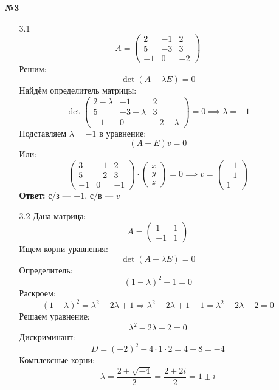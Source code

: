 \documentclass[a4paper]{article}
\begin{document}
\begin{enumerate}
   \item[\textbf{№3}]
   \begin{enumerate}
    \item[3.1]\[
    A = 
    \begin{pmatrix}
    2 & -1 & 2 \\
    5 & -3 & 3 \\
    -1 & 0 & -2
    \end{pmatrix}
    \]
    Решим:
    \[
    \det(A - \lambda E) = 0
    \]
    Найдём определитель матрицы:
    \[
    \det \begin{pmatrix}
    2 - \lambda & -1 & 2 \\
    5 & -3 - \lambda & 3 \\
    -1 & 0 & -2 - \lambda
    \end{pmatrix} = 0 \implies \lambda = -1
    \]
    Подставляем \( \lambda = -1 \) в уравнение:
    \[
    (A + E)v = 0
    \]
    Или:
    \[
    \begin{pmatrix}
    3 & -1 & 2 \\
    5 & -2 & 3 \\
    -1 & 0 & -1
    \end{pmatrix}
    \cdot
    \begin{pmatrix}
    x \\
    y \\
    z
    \end{pmatrix}
    = 0
    \implies v = \begin{pmatrix} -1 \\ -1 \\ 1 \end{pmatrix} \]
    \textbf{Ответ: } с/з --- $-1$, с/в --- $v$\\

    \item[3.2]
    Дана матрица:
    \[
    A = \begin{pmatrix}
    1 & 1 \\
    -1 & 1
    \end{pmatrix}
    \]
    Ищем корни уравнения:
    \[
    \det(A - \lambda E) = 0
    \]
    Определитель:
    \[
    (1 - \lambda)^2 + 1 = 0
    \]
    Раскроем:
    \[
    (1 - \lambda)^2 = \lambda^2 - 2\lambda + 1
    \Rightarrow
    \lambda^2 - 2\lambda + 1 + 1 = \lambda^2 - 2\lambda + 2 = 0
    \]
    Решаем уравнение:
    \[
    \lambda^2 - 2\lambda + 2 = 0
    \]
    Дискриминант:
    \[
    D = (-2)^2 - 4 \cdot 1 \cdot 2 = 4 - 8 = -4
    \]
    Комплексные корни:
    \[
    \lambda = \frac{2 \pm \sqrt{-4}}{2} = \frac{2 \pm 2i}{2} = 1 \pm i
    \]
    

\end{enumerate}
\end{enumerate}
\end{document}

